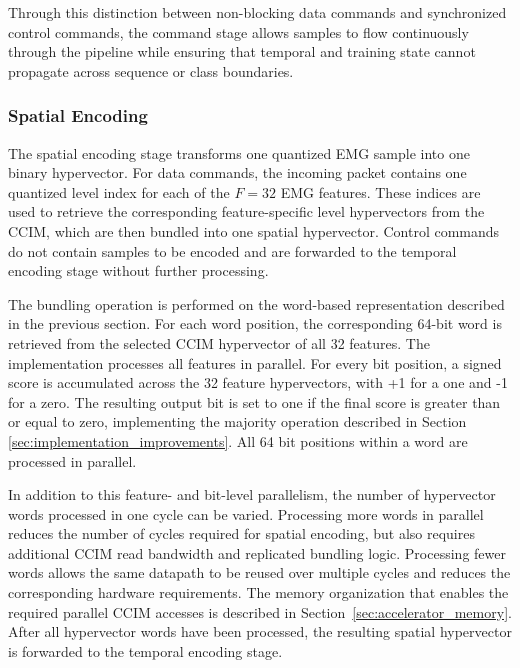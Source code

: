     Through this distinction between non-blocking data commands and synchronized control commands, the command stage allows samples to flow continuously through the pipeline while ensuring that temporal and training state cannot propagate across sequence or class boundaries.
    
    \subsubsection{Spatial Encoding}
    
    The spatial encoding stage transforms one quantized EMG sample into one binary hypervector. For data commands, the incoming packet contains one quantized level index for each of the $F=32$ EMG features. These indices are used to retrieve the corresponding feature-specific level hypervectors from the \ac{CCIM}, which are then bundled into one spatial hypervector. Control commands do not contain samples to be encoded and are forwarded to the temporal encoding stage without further processing.

   The bundling operation is performed on the word-based representation described in the previous section. For each word position, the corresponding 64-bit word is retrieved from the selected CCIM hypervector of all 32 features. The implementation processes all features in parallel. For every bit position, a signed score is accumulated across the 32 feature hypervectors, with +1 for a one and -1 for a zero. The resulting output bit is set to one if the final score is greater than or equal to zero, implementing the majority operation described in Section \ref{sec:implementation_improvements}. All 64 bit positions within a word are processed in parallel.

    In addition to this feature- and bit-level parallelism, the number of hypervector words processed in one cycle can be varied. Processing more words in parallel reduces the number of cycles required for spatial encoding, but also requires additional CCIM read bandwidth and replicated bundling logic. Processing fewer words allows the same datapath to be reused over multiple cycles and reduces the corresponding hardware requirements. The memory organization that enables the required parallel CCIM accesses is described in Section~\ref{sec:accelerator_memory}.\\

    After all hypervector words have been processed, the resulting spatial hypervector is forwarded to the temporal encoding stage.
    
